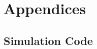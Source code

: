 \documentclass[a4paper,12pt]{article}
\begin{document}
\appendix
\section{Appendices}

%

\subsection{Simulation Code}
\end{document}
